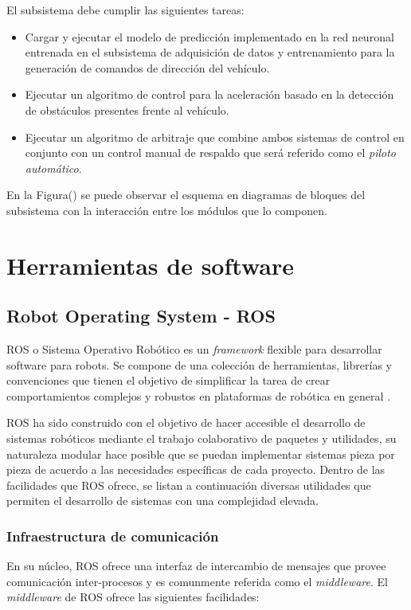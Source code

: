     El subsistema debe cumplir las siguientes tareas:
    \begin{itemize}
        \item Cargar y ejecutar el modelo de predicción implementado en la red neuronal entrenada en el subsistema de adquisición de datos y entrenamiento para la generación de comandos de dirección del vehículo.
        \item Ejecutar un algoritmo de control para la aceleración basado en la detección de obstáculos presentes frente al vehículo.
        \item Ejecutar un algoritmo de arbitraje que combine ambos sistemas de control en conjunto con un control manual de respaldo que será referido como el \textit{piloto automático}.
    \end{itemize}

    En la Figura() se puede observar el esquema en diagramas de bloques del subsistema con la interacción entre los módulos que 
    lo componen.

\section{Herramientas de software}
    \subsection{Robot Operating System - ROS}\label{sec:ros}
    ROS o Sistema Operativo Robótico es un \textit{framework} flexible para desarrollar software para robots. Se compone 
    de una colección de herramientas, librerías y convenciones que tienen el objetivo de simplificar la tarea de crear 
    comportamientos complejos y robustos en plataformas de robótica en general \cite{ros}.

    ROS ha sido construido con el objetivo de hacer accesible el desarrollo de sistemas robóticos mediante el trabajo 
    colaborativo de paquetes y utilidades, su naturaleza modular hace posible que se puedan implementar sistemas pieza 
    por pieza de acuerdo a las necesidades específicas de cada proyecto. Dentro de las facilidades que ROS ofrece, se listan 
    a continuación diversas utilidades que permiten el desarrollo de sistemas con una complejidad elevada.

        \subsubsection{Infraestructura de comunicación}
        En su núcleo, ROS ofrece una interfaz de intercambio de mensajes que provee comunicación inter-procesos y es 
        comunmente referida como el \textit{middleware}. El \textit{middleware} de ROS ofrece las siguientes facilidades:


